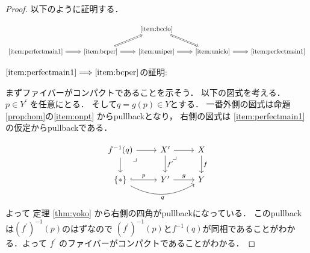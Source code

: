 \documentclass[leqno, a4paper, 12pt, dvipdfmx]{jsarticle}
\newcommand{\To}{\Longrightarrow}
\begin{document}
\begin{proof}

以下のように証明する．

\[
\begin{tikzcd}
& & \ref{item:bcclo}  \arrow[dr, Rightarrow]& &\\
\ref{item:perfectmain1} \arrow[r, Rightarrow] & \ref{item:bcper}  \arrow[ur, Rightarrow]\arrow[r, Rightarrow] & \ref{item:uniper}
\arrow[r, Rightarrow] & \ref{item:uniclo} \arrow[r, Rightarrow]& \ref{item:perfectmain1} 
\end{tikzcd}
\]


$\ref{item:perfectmain1}\To \ref{item:bcper}$の証明:


まずファイバーがコンパクトであることを示そう．
以下の図式を考える．
$p\in Y^{\prime}$
を任意にとる．
そして$q=g(p)\in Y$とする．
一番外側の図式は命題\ref{prop:hom}の\ref{item:onpt}
からpullbackとなり，
右側の図式は
\ref{item:perfectmain1}の仮定からpullbackである．

\[
\begin{tikzcd}
f^{-1}(q) \arrow[dr, phantom, "\lrcorner", very near start] \arrow[r] \arrow[d] & X^{\prime} \arrow[r] \arrow[d, "f^{\prime}"] \arrow[dr, phantom, "\lrcorner", very near start]
 & X \arrow[d, "f"]\\
\{*\} \arrow[r, hook, "p" ]
\arrow[rr, bend right, "q"' ]
& Y^{\prime} \arrow[r, "g"] & Y
\end{tikzcd}
\]
よって
定理 
\ref{thm:yoko}
から右側の四角がpullbackになっている．
このpullbackは$(f^{\prime})^{-1}(p)$のはずなので
$(f^{\prime})^{-1}(p)$と$f^{-1}(q)$が同相であることがわかる．よって
$f^{\prime}$
のファイバーがコンパクトであることがわかる．



\end{proof}
\end{document}
